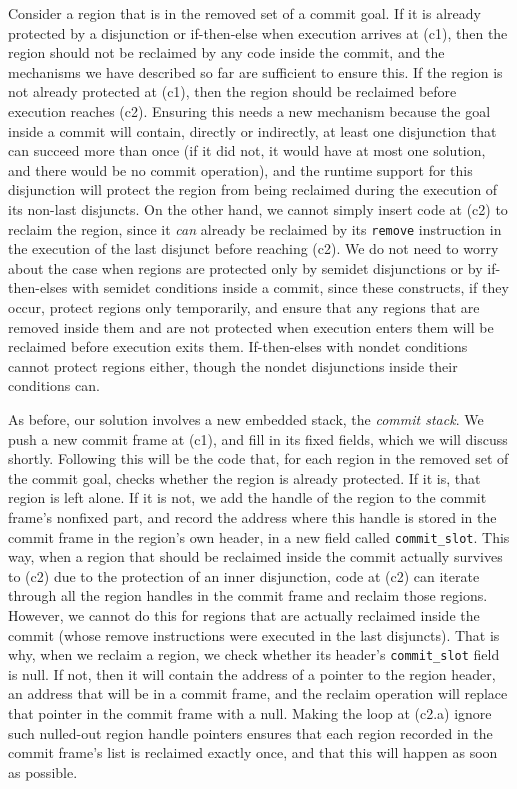 \documentclass{tlp}
\newcommand{\code}[1]{{\tt#1}}
\begin{document}
Consider a region that is in the removed set of a commit goal.
If it is already protected by a disjunction or if-then-else
when execution arrives at (c1),
then the region should not be reclaimed by any code inside the commit,
and the mechanisms we have described so far are sufficient to ensure this.
If the region is not already protected at (c1),
then the region should be reclaimed
before execution reaches (c2).
Ensuring this needs a new mechanism
because the goal inside a commit will contain, directly or indirectly,
at least one disjunction that can succeed more than once
(if it did not, it would have at most one solution,
and there would be no commit operation),
and the runtime support for this disjunction will protect the region
from being reclaimed during the execution of its non-last disjuncts.
On the other hand, we cannot simply insert code at (c2)
to reclaim the region,
since it \emph{can} already be reclaimed
by its \code{remove} instruction in the execution of the last disjunct
before reaching (c2).
We do not need to worry about the case when regions are protected
only by semidet disjunctions
or by if-then-elses with semidet conditions inside a commit,
since these constructs, if they occur, protect regions only temporarily,
and ensure that any regions that are removed inside them
and are not protected when execution enters them
will be reclaimed before execution exits them.
If-then-elses with nondet conditions cannot protect regions either,
though the nondet disjunctions inside their conditions can.

As before, our solution involves a new embedded stack, the \emph{commit stack}.
We push a new commit frame at (c1), and fill in its fixed fields,
which we will discuss shortly.
Following this will be the code that,
for each region in the removed set of the commit goal,
checks whether the region is already protected.
If it is, that region is left alone.
If it is not, we add the handle of the region
to the commit frame's nonfixed part,
and record the address where this handle is stored in the commit frame
in the region's own header, in a new field called \code{commit\_slot}.
This way, when a region that should be reclaimed inside the commit
actually survives to (c2) due to the protection of an inner disjunction,
code at (c2) can iterate through all the region handles in the commit frame
and reclaim those regions.
However, we cannot do this for regions
that are actually reclaimed inside the commit
(whose remove instructions were executed in the last disjuncts).
That is why, when we reclaim a region,
we check whether its header's \code{commit\_slot} field is null.
If not, then it will contain
the address of a pointer to the region header,
an address that will be in a commit frame,
and the reclaim operation will replace that pointer in the commit frame
with a null.
Making the loop at (c2.a) ignore such nulled-out region handle pointers
ensures that each region recorded in the commit frame's list
is reclaimed exactly once, and that this will happen as soon as possible.
\end{document}
